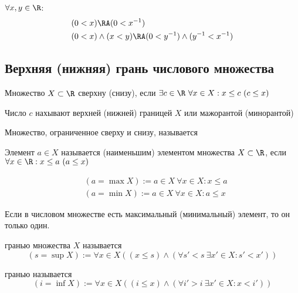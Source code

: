 \documentclass[a4paper, 14pt]{article}
\begin{document}
    \begin{theorem}
        $\forall x,y \in \R$:
        \begin{align*}
            &(0 < x) \RA (0 < x^{-1}) \\
            &(0 < x) \land (x < y) \RA (0 < y^{-1}) \land (y^{-1} < x^{-1})
        \end{align*}
    \end{theorem}

    \subsection{Верхняя (нижняя) грань числового множества}

    \begin{definition}
        Множество $X \subset \R$ { сверхну (снизу)}, если
        $\exists c \in \R \ \forall x \in X: x \leq c \ (c \leq x)$
    \end{definition}
    Число $c$ нахывают верхней (нижней) границей $X$ или мажорантой (минорантой)
    \begin{definition}
        Множество, ограниченное сверху и снизу, называется 
        {}
    \end{definition}
    \begin{definition}
        Элемент $a \in X$ называется { (наименьшим)} 
        элементом множества $X \subset \R$, если $\forall x \in \R: x \leq a \ (a \leq x)$

        \begin{align*}
            &(a = \max X) := a \in X \ \forall x \in X: x \leq a \\
            &(a = \min X) := a \in X \ \forall x \in X: a \leq x
        \end{align*}
    \end{definition}

    \begin{lemma}
        Если в числовом множестве есть максимальный (минимальный) элемент, то он только один.
    \end{lemma}
    \begin{definition}
        { гранью} множества $X$ называется 
        \[(s = \sup X) := \forall x \in X ((x \leq s) \land (\forall s' < s \ \exists x' \in X: s' < x'))\]
    \end{definition}
    \begin{definition}
        { гранью} называется
        \[(i = \inf X) := \forall x \in X((i \leq x) \land (\forall i' > i \ \exists x' \in X: x < i'))\]
    \end{definition}
\end{document}
